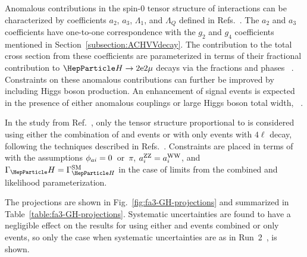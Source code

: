 Anomalous contributions in the spin-0 tensor structure of \HVV interactions can be characterized by coefficients $a_2$, $a_3$, $\Lambda_1$, and $\Lambda_Q$ defined in Refs.~\cite{Khachatryan:2014kca, Khachatryan:2015mma}. The $a_2$ and $a_3$ coefficients have one-to-one correspondence with the $g_2$ and $g_4$ coefficients mentioned in Section~\ref{subsection:ACHVVdecay}.
The contribution to the total cross section from these coefficients are parameterized in terms of their fractional contribution to \onshell $\PH\to2\mathrm{e}2\mathrm{\mu}$ decays via the fractions \fai and phases \pai~\cite{Khachatryan:2014kca, Khachatryan:2015mma}.
Constraints on these anomalous contributions can further be improved by including \offshell Higgs boson production. An enhancement of signal events is expected in the presence of either anomalous \HVV couplings or large Higgs boson total width, \GH~\cite{Khachatryan:2015mma,deFlorian:2016spz,CMS-PAS-HIG-18-002}.

In the study from Ref.~\cite{CMS-PAS-FTR-18-011}, only the tensor structure proportional to  is considered using either the combination of \onshell and \offshell events or with only \onshell events with $4\ell$ decay, following the techniques described in Refs.~\cite{Khachatryan:2014kca,deFlorian:2016spz,CMS-PAS-HIG-18-002}. Constraints are placed in terms of \fcospai with the assumptions $\phi_{a i}=0$~or~$\pi$, $a_{i}^\mathrm{ZZ}=a_{i}^\mathrm{WW}$, and ${\GH}={\GHSM}$ in the case of limits from the combined \onshell and \offshell likelihood parameterization.

The projections are shown in Fig.~\ref{fig:fa3-GH-projections} and summarized in Table~\ref{table:fa3-GH-projections}. Systematic uncertainties are found to have a negligible effect on the results for  using either \onshell and \offshell events combined or only \onshell events, so only the case when systematic uncertainties are as in Run~2~\cite{CMS-PAS-HIG-18-002}, is shown.


